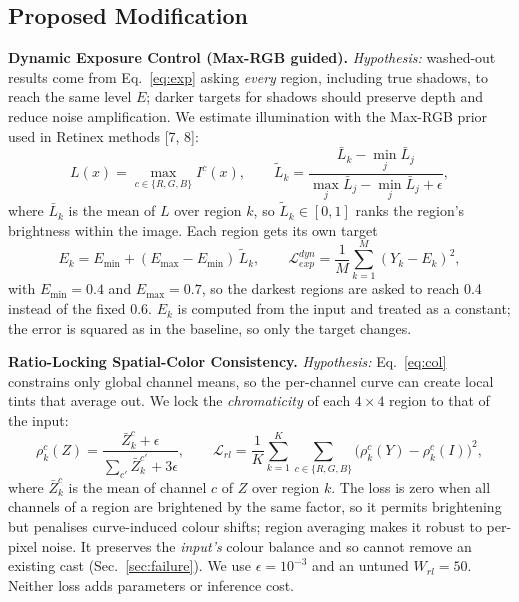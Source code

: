 \documentclass[11pt, letterpaper]{article}
\begin{document}
\subsection{Proposed Modification}
\label{sec:mod}

\textbf{Dynamic Exposure Control (Max-RGB guided).}
\emph{Hypothesis:} washed-out results come from Eq.~\eqref{eq:exp} asking
\emph{every} region, including true shadows, to reach the same level $E$; darker
targets for shadows should preserve depth and reduce noise amplification. We
estimate illumination with the Max-RGB prior used in Retinex methods [7, 8]:
\begin{equation}
  L(x) = \max_{c\in\{R,G,B\}} I^c(x), \qquad
  \tilde{L}_k = \frac{\bar{L}_k - \min_j \bar{L}_j}{\max_j \bar{L}_j - \min_j \bar{L}_j + \epsilon},
\end{equation}
where $\bar{L}_k$ is the mean of $L$ over region $k$, so $\tilde{L}_k\in[0,1]$ ranks
the region's brightness within the image. Each region gets its own target
\begin{equation}
  E_k = E_{\min} + (E_{\max} - E_{\min})\,\tilde{L}_k, \qquad
  \mathcal{L}_{exp}^{dyn} = \frac{1}{M}\sum_{k=1}^{M} (Y_k - E_k)^2 ,
\end{equation}
with $E_{\min} = 0.4$ and $E_{\max} = 0.7$, so the darkest regions are asked to
reach 0.4 instead of the fixed 0.6. $E_k$ is computed from the input and treated
as a constant; the error is squared as in the baseline, so only the target changes.

\textbf{Ratio-Locking Spatial-Color Consistency.}
\emph{Hypothesis:} Eq.~\eqref{eq:col} constrains only global channel means, so
the per-channel curve can create local tints that average out. We lock the
\emph{chromaticity} of each $4\times4$ region to that of the input:
\begin{equation}
  \rho_k^c(Z) = \frac{\bar{Z}_k^c + \epsilon}{\sum_{c'} \bar{Z}_k^{c'} + 3\epsilon},
  \qquad
  \mathcal{L}_{rl} = \frac{1}{K}\sum_{k=1}^{K}\sum_{c\in\{R,G,B\}}
  \bigl(\rho_k^c(Y) - \rho_k^c(I)\bigr)^2 ,
\end{equation}
where $\bar{Z}_k^c$ is the mean of channel $c$ of $Z$ over region $k$. The loss is
zero when all channels of a region are brightened by the same factor, so it permits
brightening but penalises curve-induced colour shifts; region averaging makes it
robust to per-pixel noise. It preserves the \emph{input's} colour balance and so
cannot remove an existing cast (Sec.~\ref{sec:failure}). We use
$\epsilon = 10^{-3}$ and an untuned $W_{rl} = 50$. Neither loss adds parameters or
inference cost.
\end{document}
